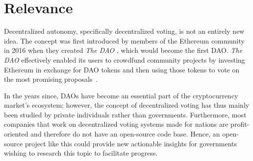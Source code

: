 \section{Relevance}\label{sec:relevance}

Decentralized autonomy, specifically decentralized voting, is not an entirely new idea.
The concept was first introduced by members of the Ethereum community in 2016 when they created \emph{The DAO} \autocites[section 3.1]{el_faqir_overview_2020}{falkon_story_2018}, which would become the first \gls{DAO}.
\emph{The DAO} effectively enabled its users to crowdfund community projects by investing Ethereum in exchange for DAO tokens and then using those tokens to vote on the most promising proposals~\autocite{falkon_story_2018}.

In the years since, \glspl{DAO} have become an essential part of the cryptocurrency market’s ecosystem;
however, the concept of decentralized voting has thus mainly been studied by private individuals rather than governments.
Furthermore, most companies that work on decentralized voting systems made for nations are profit-oriented and therefore do not have an open-source code base.
Hence, an open-source project like this could provide new actionable insights for governments wishing to research this topic to facilitate progress.


